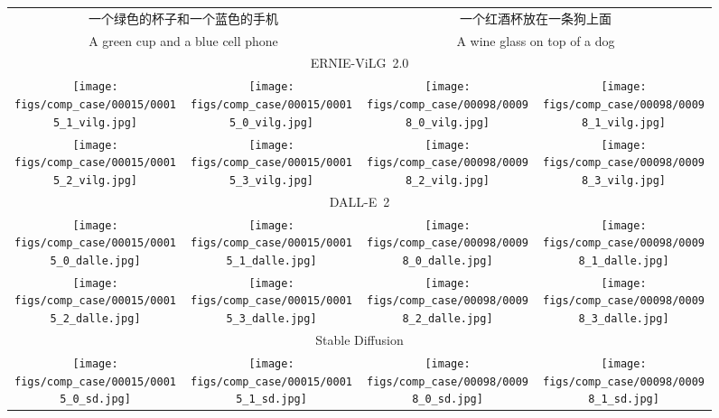 \documentclass[10pt,twocolumn,letterpaper]{article}
\begin{document}
\begin{CJK*}{UTF8}{gbsn}
\begin{figure*}[htbp]
\centering
\begin{tabular}{c@{\hskip 2.5pt}c@{\hskip 8pt}c@{\hskip 2.5pt}c}
\multicolumn{2}{c}{\scriptsize 一个绿色的杯子和一个蓝色的手机} & \multicolumn{2}{c}{\scriptsize 一个红酒杯放在一条狗上面} \\
\multicolumn{2}{c}{\scriptsize A green cup and a blue cell phone} & 
\multicolumn{2}{c}{\scriptsize A wine glass on top of a dog} \\
\multicolumn{4}{c}{\scriptsize ERNIE-ViLG~2.0} \\
{\texttt{[image: figs/comp\_case/00015/00015\_1\_vilg.jpg]}} &
{\texttt{[image: figs/comp\_case/00015/00015\_0\_vilg.jpg]}} &
{\texttt{[image: figs/comp\_case/00098/00098\_0\_vilg.jpg]}} &
{\texttt{[image: figs/comp\_case/00098/00098\_1\_vilg.jpg]}} \\
{\texttt{[image: figs/comp\_case/00015/00015\_2\_vilg.jpg]}} &
{\texttt{[image: figs/comp\_case/00015/00015\_3\_vilg.jpg]}} &
{\texttt{[image: figs/comp\_case/00098/00098\_2\_vilg.jpg]}} &
{\texttt{[image: figs/comp\_case/00098/00098\_3\_vilg.jpg]}} \\
\multicolumn{4}{c}{\scriptsize DALL-E~2} \\
{\texttt{[image: figs/comp\_case/00015/00015\_0\_dalle.jpg]}} &
{\texttt{[image: figs/comp\_case/00015/00015\_1\_dalle.jpg]}} &
{\texttt{[image: figs/comp\_case/00098/00098\_0\_dalle.jpg]}} &
{\texttt{[image: figs/comp\_case/00098/00098\_1\_dalle.jpg]}} \\
{\texttt{[image: figs/comp\_case/00015/00015\_2\_dalle.jpg]}} &
{\texttt{[image: figs/comp\_case/00015/00015\_3\_dalle.jpg]}} &
{\texttt{[image: figs/comp\_case/00098/00098\_2\_dalle.jpg]}} &
{\texttt{[image: figs/comp\_case/00098/00098\_3\_dalle.jpg]}} \\
\multicolumn{4}{c}{\scriptsize Stable Diffusion} \\
{\texttt{[image: figs/comp\_case/00015/00015\_0\_sd.jpg]}} &
{\texttt{[image: figs/comp\_case/00015/00015\_1\_sd.jpg]}} &
{\texttt{[image: figs/comp\_case/00098/00098\_0\_sd.jpg]}} &
{\texttt{[image: figs/comp\_case/00098/00098\_1\_sd.jpg]}} \\

\end{tabular}
\end{figure*}
\end{CJK*}
\end{document}
